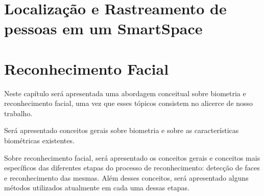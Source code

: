 
\chapter{Localização e Rastreamento de pessoas em um SmartSpace}


	

\chapter{Reconhecimento Facial}

	Neste capítulo será apresentada uma abordagem conceitual sobre biometria e reconhecimento facial, uma vez que esses tópicos consistem no alicerce de nosso trabalho. 

	Será apresentado conceitos gerais sobre biometria e sobre as características biométricas existentes.

	Sobre reconhecimento facial, será apresentado os conceitos gerais e conceitos mais específicos das diferentes etapas do processo de reconhecimento: detecção de faces e reconhecimento das mesmas. Além desses conceitos, será apresentado alguns métodos utilizados atualmente em cada uma dessas etapas.


	
	







